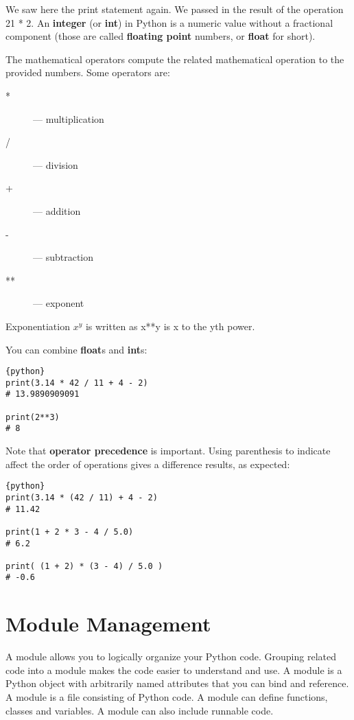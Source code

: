 We saw here the print statement again. We passed in the result of the
operation 21 * 2. An \textbf{integer} (or \textbf{int}) in Python is a
numeric value without a fractional component (those are called
\textbf{floating point} numbers, or \textbf{float} for short).

The mathematical operators compute the related mathematical operation to
the provided numbers. Some operators are:

\begin{description}
  \item[*] --- multiplication
  \item[/] --- division
  \item[+] --- addition
  \item[-] --- subtraction
  \item[**] --- exponent
\end{description}

Exponentiation $x^y$ is written as x**y is x to the yth power.

You can combine \textbf{float}s and \textbf{int}s:

\begin{lstlisting}{python}
print(3.14 * 42 / 11 + 4 - 2)
# 13.9890909091

print(2**3)
# 8
\end{lstlisting}

Note that \textbf{operator precedence} is important. Using parenthesis
to indicate affect the order of operations gives a difference results,
as expected:

\begin{lstlisting}{python}
print(3.14 * (42 / 11) + 4 - 2)
# 11.42

print(1 + 2 * 3 - 4 / 5.0)
# 6.2

print( (1 + 2) * (3 - 4) / 5.0 )
# -0.6
\end{lstlisting}



\section{Module Management}\label{module-management}

A module allows you to logically organize your Python code. Grouping
related code into a module makes the code easier to understand and use.
A module is a Python object with arbitrarily named attributes that you
can bind and reference. A module is a file consisting of Python code. A
module can define functions, classes and variables. A module can also
include runnable code.

